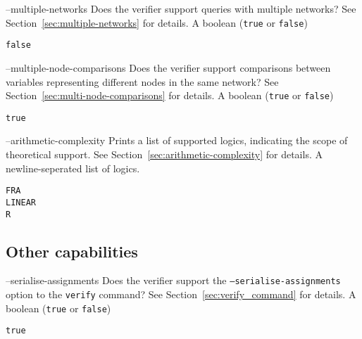 \clOutputOption
{--multiple-networks}
{Does the verifier support queries with multiple networks? See Section~\ref{sec:multiple-networks} for details.}
{A boolean (\texttt{true} or \texttt{false})}
\begin{lstlisting}[style=bash]
%*\exampleVerifier* supports --multiple-networks
false
\end{lstlisting}

\clOutputOption
{--multiple-node-comparisons}
{Does the verifier support comparisons between variables representing different nodes in the same network? See Section~\ref{sec:multi-node-comparisons} for details.}
{A boolean (\texttt{true} or \texttt{false})}
\begin{lstlisting}[style=bash]
%*\exampleVerifier* supports --multiple-node-comparisons
true
\end{lstlisting}

\clOutputOption
{--arithmetic-complexity}
{Prints a list of supported \vnnlib{} logics, indicating the scope of theoretical support. See Section~\ref{sec:arithmetic-complexity} for details.
}
{A newline-seperated list of logics.}
\begin{lstlisting}[style=bash]
%*\exampleVerifier* supports --logics
FRA
LINEAR
R
\end{lstlisting}

\subsection{Other capabilities}
\label{sec:other-capabilities}

\clOutputOption
{--serialise-assignments}
{Does the verifier support the \texttt{--serialise-assignments} option to the \texttt{verify} command? See Section~\ref{sec:verify_command} for details.}
{A boolean (\texttt{true} or \texttt{false})}
\begin{lstlisting}[style=bash]
%*\exampleVerifier* supports --serialise-assignments
true
\end{lstlisting}




